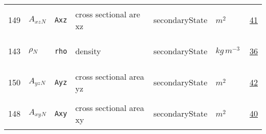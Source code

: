 \begin{longtable}{|p{1cm}|p{2.5cm}|p{4.5cm}|p{8cm}|p{3.0cm}|p{3cm}|p{1cm}|}
            149
             & \hypertarget{"v:149"}{ $ {{A_{xz}}}{_{N}} $}
             & \verb|Axz|
             & cross sectional are xz
             & \begin{lay}secondaryState \end{lay}
             & $ m^{2} \, $
             &                 \hyperlink{"e:41"}{ 41 }
                 \\
            143
             & \hypertarget{"v:143"}{ $ {{\rho}}{_{N}} $}
             & \verb|rho|
             & density
             & \begin{lay}secondaryState \end{lay}
             & $ kg \,m^{-3} \, $
             &                 \hyperlink{"e:36"}{ 36 }
                 \\
            150
             & \hypertarget{"v:150"}{ $ {{A_{yz}}}{_{N}} $}
             & \verb|Ayz|
             & cross sectional area yz
             & \begin{lay}secondaryState \end{lay}
             & $ m^{2} \, $
             &                 \hyperlink{"e:42"}{ 42 }
                 \\
            148
             & \hypertarget{"v:148"}{ $ {{A_{xy}}}{_{N}} $}
             & \verb|Axy|
             & cross sectional area xy
             & \begin{lay}secondaryState \end{lay}
             & $ m^{2} \, $
             &                 \hyperlink{"e:40"}{ 40 }
                 \\
    \end{longtable}